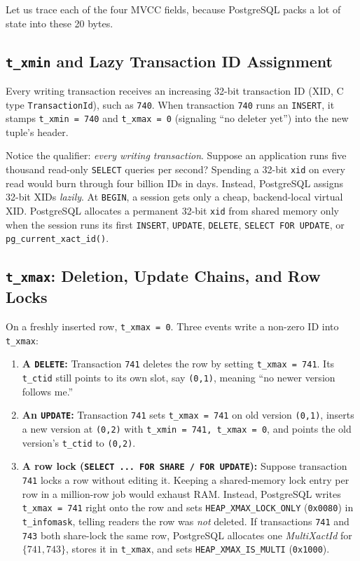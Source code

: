 Let us trace each of the four MVCC fields, because PostgreSQL packs a lot of state into these 20 bytes.

\subsection{\texttt{t\_xmin} and Lazy Transaction ID Assignment}

Every writing transaction receives an increasing 32-bit transaction ID (XID, C type \texttt{TransactionId}), such as \texttt{740}. When transaction \texttt{740} runs an \texttt{INSERT}, it stamps \texttt{t\_xmin = 740} and \texttt{t\_xmax = 0} (signaling ``no deleter yet'') into the new tuple's header.

Notice the qualifier: \emph{every writing transaction}. Suppose an application runs five thousand read-only \texttt{SELECT} queries per second? Spending a 32-bit \texttt{xid} on every read would burn through four billion IDs in days. Instead, PostgreSQL assigns 32-bit XIDs \emph{lazily}. At \texttt{BEGIN}, a session gets only a cheap, backend-local virtual XID. PostgreSQL allocates a permanent 32-bit \texttt{xid} from shared memory only when the session runs its first \texttt{INSERT}, \texttt{UPDATE}, \texttt{DELETE}, \texttt{SELECT FOR UPDATE}, or \texttt{pg\_current\_xact\_id()}.

\subsection{\texttt{t\_xmax}: Deletion, Update Chains, and Row Locks}

On a freshly inserted row, \texttt{t\_xmax = 0}. Three events write a non-zero ID into \texttt{t\_xmax}:
\begin{enumerate}
  \item \textbf{A \texttt{DELETE}:} Transaction \texttt{741} deletes the row by setting \texttt{t\_xmax = 741}. Its \texttt{t\_ctid} still points to its own slot, say \texttt{(0,1)}, meaning ``no newer version follows me.''
  \item \textbf{An \texttt{UPDATE}:} Transaction \texttt{741} sets \texttt{t\_xmax = 741} on old version \texttt{(0,1)}, inserts a new version at \texttt{(0,2)} with \texttt{t\_xmin = 741, t\_xmax = 0}, and points the old version's \texttt{t\_ctid} to \texttt{(0,2)}.
  \item \textbf{A row lock (\texttt{SELECT ... FOR SHARE / FOR UPDATE}):} Suppose transaction \texttt{741} locks a row without editing it. Keeping a shared-memory lock entry per row in a million-row job would exhaust RAM. Instead, PostgreSQL writes \texttt{t\_xmax = 741} right onto the row and sets \texttt{HEAP\_XMAX\_LOCK\_ONLY} (\texttt{0x0080}) in \texttt{t\_infomask}, telling readers the row was \emph{not} deleted. If transactions \texttt{741} and \texttt{743} both share-lock the same row, PostgreSQL allocates one \emph{MultiXactId} for $\{741, 743\}$, stores it in \texttt{t\_xmax}, and sets \texttt{HEAP\_XMAX\_IS\_MULTI} (\texttt{0x1000}).
\end{enumerate}

